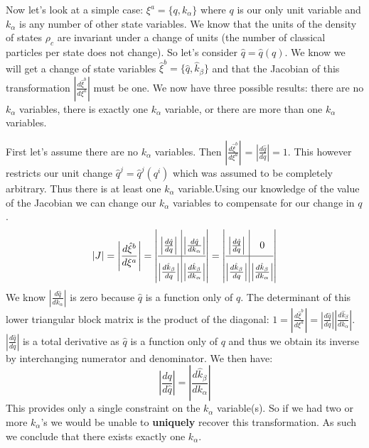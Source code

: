 \documentclass{article}
\begin{document}
	Now let's look at a simple case: $\xi^a = \{q,k_\alpha\}$ where $q$ is our only unit variable and $k_\alpha$ is any number of other state variables. We know that the units of the density of states $\rho_c$ are invariant under a change of units (the number of classical particles per state does not change). So let's consider $\hat{q} = \hat{q}(q)$. We know we will get a change of state variables $\hat{\xi}^b = \{\hat{q},\hat{k}_\beta\}$ and that the Jacobian of this transformation $\left|\frac{d\hat{\xi}^b}{d\xi^a}\right|$ must be one. We now have three possible results: there are no $k_\alpha$ variables, there is exactly one $k_\alpha$ variable, or there are more than one $k_\alpha$ variables.
	
	First let's assume there are no $k_\alpha$ variables. Then $\left|\frac{d\hat{\xi}^b}{d\xi^a}\right|$ = $\left|\frac{d\hat{q}}{dq}\right| = 1$. This however restricts our unit change $\hat{q}^j = \hat{q}^j(q^i)$ which was assumed to be completely arbitrary. Thus there is at least one $k_\alpha$ variable.Using our knowledge of the value of the Jacobian we can change our $k_\alpha$ variables to compensate for our change in $q$.
	\begin{equation}
	\label{}
	\left|J\right| = \left|\frac{d\hat{\xi}^b}{d\xi^a}\right| = \left| \arraycolsep=1.7pt\def\arraystretch{2.2}
	\begin{array}{@{}c|c@{}} \left|\frac{d\hat{q}}{dq}\right| & \left|\frac{d\hat{q}}{dk_\alpha}\right| \\
\hline \left|\frac{d\hat{k}_\beta}{dq}\right| & \left|\frac{d\hat{k}_\beta}{dk_\alpha}\right|
\end{array}	\right| = \left| \arraycolsep=1.7pt\def\arraystretch{2.2}
	\begin{array}{@{}c|c@{}} \left|\frac{d\hat{q}}{dq}\right| & 0 \\
\hline \left|\frac{d\hat{k}_\beta}{dq}\right| & \left|\frac{d\hat{k}_\beta}{dk_\alpha}\right|
\end{array}	\right|
	\end{equation}
We know $\left|\frac{d\hat{q}}{dk_\alpha}\right|$ is zero because $\hat{q}$ is a function only of $q$. The determinant of this lower triangular block matrix is the product of the diagonal: $1 = |\frac{d\hat{\xi}^b}{d\xi^a}| = \left|\frac{d\hat{q}}{dq}\right|\left|\frac{d\hat{k}_\beta}{dk_\alpha}\right|$. $\left|\frac{d\hat{q}}{dq}\right|$ is a total derivative as $\hat{q}$ is a function only of $q$ and thus we obtain its inverse by interchanging numerator and denominator. We then have:
	\begin{equation}
	\label{}
	 \left|\frac{dq}{d\hat{q}}\right| = \left|\frac{d\hat{k}_\beta}{dk_\alpha}\right|
	\end{equation}
This provides only a single constraint on the $k_\alpha$ variable(s). So if we had two or more $k_\alpha$'s we would be unable to \textbf{uniquely} recover this transformation. As such we conclude that there exists exactly one $k_\alpha$. 
\end{document}
